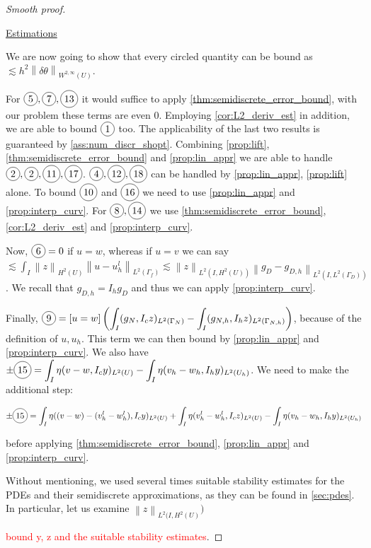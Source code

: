 \documentclass[english,a4paper,9pt,oneside]{scrbook}	%
\theoremstyle{break}
\newenvironment{mproof}[1][\proofname]{%
  \begin{proof}[#1]$ $\par\nobreak\ignorespaces
}{%
  \end{proof}
}
\renewcommand*{\proofname}{Proof}
\theoremstyle{remark}
\newcommand{\ds}{\displaystyle}
\newcommand{\norm}[1]{\left\lVert#1\right\rVert}
\newcommand{\te}{\theta}
\newcommand{\tred}[1]{\textcolor{red}{#1}}
\newcommand{\dive}{\text{div}}
\newcommand*\circled[1]{\tikz[baseline=(char.base)]{
            \node[shape=circle,draw,inner sep=2pt] (char) {#1};}}
\begin{document}
\begin{mproof}[Smooth proof]
\underline{Estimations}

We are now going to show that every circled quantity can be bound as $\lesssim h^2 \norm{\delta \te}_{W^{2,\infty}(U)}$.

For $\circled{5},\circled{7},\circled{13}$ it would suffice to apply \cref{thm:semidiscrete_error_bound}, with our problem these terms are even $0$. Employing \cref{cor:L2_deriv_est} in addition, we are able to bound $\circled{1}$ too. The applicability of the last two results is guaranteed by \cref{ass:num_discr_shopt}. Combining \cref{prop:lift},   \cref{thm:semidiscrete_error_bound} and \cref{prop:lin_appr} we are able to handle $\circled{2}, \circled{2}, \circled{11}, \circled{17}$. $\circled{4}, \circled{12}, \circled{18}$ can be handled by \cref{prop:lin_appr}, \cref{prop:lift} alone. To bound $\circled{10} $ and $\circled{16}$ we need to use  \cref{prop:lin_appr} and \cref{prop:interp_curv}. For $\circled{8}, \circled{14}$ we use \cref{thm:semidiscrete_error_bound}, \cref{cor:L2_deriv_est} and \cref{prop:interp_curv}.

Now, $\circled{6}=0$ if $u=w$, whereas if $u=v$ we can say $\ds \lesssim \int_I \norm{z}_{H^2(U)}\norm{u-u_h^l}_{L^2(\Gamma_f)}\lesssim \norm{z}_{L^2(I,H^2(U))}\norm{g_D -g_{D,h}}_{L^2(I,L^2(\Gamma_D))} $. We recall that $g_{D,h} = I_h g_D$ and thus we can apply \cref{prop:interp_curv}.

Finally, $\circled{9} = \ds \left [ u  = w \right ] \left ( \int_I (g_N,I_cz)_{L^2(\Gamma_N)}- \int_I (g_{N,h},I_hz)_{L^2(\Gamma_{N,h})} \right )$, because of the definition of $u, u_h$. This term we can then bound by  \cref{prop:lin_appr} and \cref{prop:interp_curv}. We also have $\ds \pm \circled{15} = \int_I \eta (v-w,I_c y)_{L^2(U)} - \int_I \eta (v_h-w_h,I_h y)_{L^2(U_h)}$. We need to make the additional step:

\begin{align*}
\pm \circled{15} = \int_I\eta((v-w)-(v_h^l-w_h^l),I_cy)_{L^2(U)} + \int_I\eta(v_h^l-w_h^l,I_c z)_{L^2(U)} - \int_I \eta (v_h-w_h,I_h y)_{L^2(U_h)}
\end{align*}  

before applying \cref{thm:semidiscrete_error_bound}, \cref{prop:lin_appr} and  \cref{prop:interp_curv}.

Without mentioning, we used several times suitable stability estimates for the PDEs and their semidiscrete approximations, as they can be found in \cref{sec:pdes}. In particular, let us examine $\norm{z}_{L^2(I,H^2(U)})$

\tred{bound y, z and the suitable stability estimates}.
%


\end{mproof}
\end{document}
